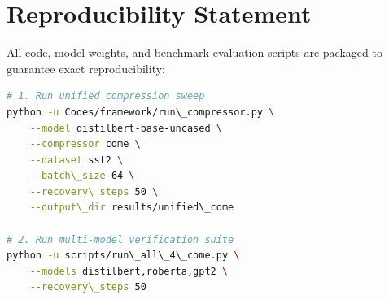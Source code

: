 \section{Reproducibility Statement}
All code, model weights, and benchmark evaluation scripts are packaged to guarantee exact reproducibility:
\begin{lstlisting}[language=bash]
# 1. Run unified compression sweep
python -u Codes/framework/run\_compressor.py \
    --model distilbert-base-uncased \
    --compressor come \
    --dataset sst2 \
    --batch\_size 64 \
    --recovery\_steps 50 \
    --output\_dir results/unified\_come

# 2. Run multi-model verification suite
python -u scripts/run\_all\_4\_come.py \
    --models distilbert,roberta,gpt2 \
    --recovery\_steps 50
\end{lstlisting}
